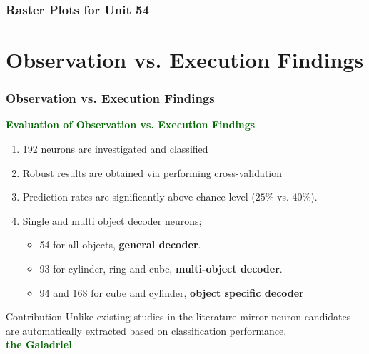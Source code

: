 \documentclass{beamer}
\begin{document}
\begin{frame}

\begin{center}
\frametitle{Raster Plots for Unit 54}

\end{center}
\end{frame}


\section{ Observation vs. Execution Findings }
\begin{frame}
\frametitle{Observation vs. Execution Findings }

\textcolor{darkgreen}{\textbf{Evaluation of Observation vs. Execution Findings }}
\begin{enumerate}
\item 192 neurons are investigated and classified
\item Robust results are obtained via performing cross-validation

\item Prediction rates are significantly above chance level ($25\%$ vs. $40\%$).
\item Single and multi object decoder neurons;
\begin{itemize}

\item 54 for all objects, \textbf{general decoder}.
\item 93 for cylinder, ring and cube, \textbf{multi-object decoder}.
\item 94 and 168 for cube and cylinder,\textbf{ object specific decoder}

\end{itemize}

\end{enumerate}

\begin{block}{Contribution}
\centering Unlike existing studies in the literature mirror neuron candidates are
automatically extracted based on classification performance.\\
\centering \textcolor{darkgreen}{\textbf{the Galadriel}} 
\end{block}

\end{frame}
\end{document}

